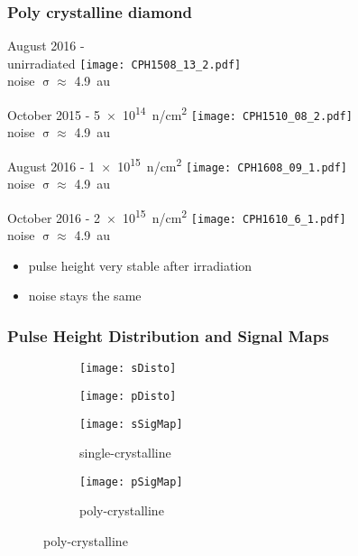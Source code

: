 \begin{frame}
	\frametitle{Poly crystalline diamond}
	\begin{minipage}{2.8cm}
		\centering
		August 2016 - \\unirradiated
		\texttt{[image: CPH1508\_13\_2.pdf]}\\
		noise $\upsigma\approx$ \SI{4.9}{au}
	\end{minipage}
	\hspace*{2pt}
	\begin{minipage}{2.8cm}
		\centering
		October 2015 - \SI[exponent-product = \cdot]{5e14}{n/cm^{2}}
		\texttt{[image: CPH1510\_08\_2.pdf]}\\
		noise $\upsigma\approx$ \SI{4.9}{au}
	\end{minipage}
	\hspace*{2pt}
	\begin{minipage}{2.8cm}
		\centering
		August 2016 - \SI[exponent-product = \cdot]{1e15}{n/cm^{2}}
		\texttt{[image: CPH1608\_09\_1.pdf]}\\
		noise $\upsigma \approx$ \SI{4.9}{au}
	\end{minipage}
	\hspace*{2pt}
	\begin{minipage}{2.8cm}
		\centering
		October 2016 - \SI[exponent-product = \cdot]{2e15}{n/cm^{2}}
		\texttt{[image: CPH1610\_6\_1.pdf]}\\
		noise $\upsigma \approx$ \SI{4.9}{au}
	\end{minipage}\s
	\begin{itemize}
		\item pulse height very stable after irradiation
		\item noise stays the same
	\end{itemize}
\end{frame}
\begin{frame}
	\frametitle{Pulse Height Distribution and Signal Maps}
	\vspace*{-7.5pt}
	\def \sp {0.62\textwidth}
	\begin{figure}
		\centering
		\begin{subfigure}{0.45\textwidth} 
			\centering 
			\texttt{[image: sDisto]}
		\end{subfigure}
		\begin{subfigure}{0.45\textwidth} 
			\centering 
			\texttt{[image: pDisto]}
		\end{subfigure}
	\end{figure}
	\vspace*{-15pt}
	\begin{figure}
	\centering
		\begin{subfigure}{0.45\textwidth} 
			\centering 
			\texttt{[image: sSigMap]}
			\caption{single-crystalline}
		\end{subfigure}
		\begin{subfigure}{0.45\textwidth} 
			\centering 
			\texttt{[image: pSigMap]}
			\caption{poly-crystalline}
		\end{subfigure} 
	\end{figure}
\end{frame}
